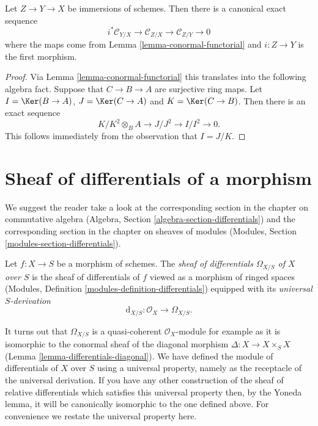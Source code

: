 \begin{lemma}
\label{lemma-transitivity-conormal}
Let $Z \to Y \to X$ be immersions of schemes. Then there is a canonical
exact sequence
$$
i^*\mathcal{C}_{Y/X} \to
\mathcal{C}_{Z/X} \to
\mathcal{C}_{Z/Y} \to 0
$$
where the maps come from
Lemma \ref{lemma-conormal-functorial}
and $i : Z \to Y$ is the first morphism.
\end{lemma}

\begin{proof}
Via
Lemma \ref{lemma-conormal-functorial}
this translates into the following algebra fact. Suppose that
$C \to B \to A$ are surjective ring maps. Let $I = \Ker(B \to A)$,
$J = \Ker(C \to A)$ and $K = \Ker(C \to B)$. Then
there is an exact sequence
$$
K/K^2 \otimes_B A \to J/J^2 \to I/I^2 \to 0.
$$
This follows immediately from the observation that $I = J/K$.
\end{proof}










\section{Sheaf of differentials of a morphism}
\label{section-sheaf-differentials}

\noindent
We suggest the reader take a look at the corresponding section
in the chapter on commutative algebra
(Algebra, Section \ref{algebra-section-differentials})
and the corresponding section in the chapter on sheaves of modules
(Modules, Section \ref{modules-section-differentials}).

\begin{definition}
\label{definition-sheaf-differentials}
Let $f : X \to S$ be a morphism of schemes.
The {\it sheaf of differentials $\Omega_{X/S}$ of $X$ over $S$} is
the sheaf of differentials of $f$ viewed as a morphism of ringed spaces
(Modules, Definition \ref{modules-definition-differentials})
equipped with its {\it universal $S$-derivation}
$$
\text{d}_{X/S} : \mathcal{O}_X \longrightarrow \Omega_{X/S}.
$$
\end{definition}

\noindent
It turns out that $\Omega_{X/S}$ is a quasi-coherent $\mathcal{O}_X$-module
for example as it is isomorphic to the conormal sheaf
of the diagonal morphism $\Delta : X \to X \times_S X$
(Lemma \ref{lemma-differentials-diagonal}).
We have defined the module of differentials of $X$ over $S$ using a
universal property, namely as the receptacle of the universal derivation.
If you have any other construction of the sheaf of relative differentials
which satisfies this universal property then, by the Yoneda lemma,
it will be canonically isomorphic to the one defined above. For convenience
we restate the universal property here.

